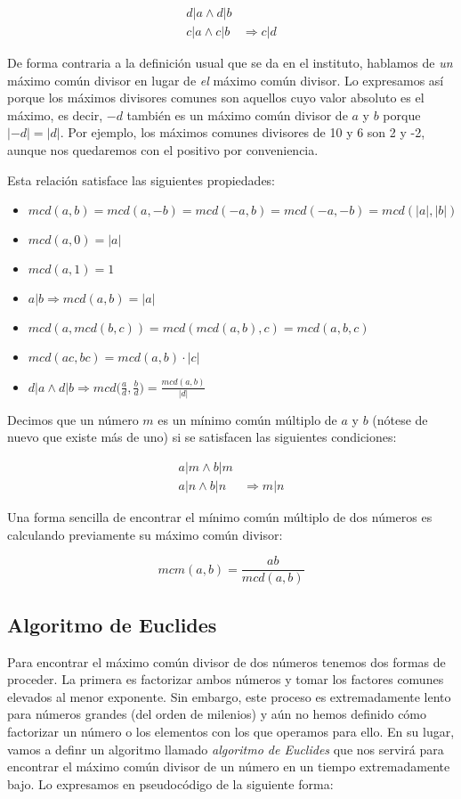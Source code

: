 \begin{align*}
	d|a \land d|b & \\
	c|a \land c|b & \Rightarrow c|d
\end{align*}

De forma contraria a la definición usual que se da en el instituto, hablamos de \textit{un} máximo común divisor en lugar de \textit{el} máximo común divisor.
Lo expresamos así porque los máximos divisores comunes son aquellos cuyo valor absoluto es el máximo, es decir, $-d$ también es un máximo común divisor de $a$ y $b$ porque $|-d| = |d|$.
Por ejemplo, los máximos comunes divisores de 10 y 6 son 2 y -2, aunque nos quedaremos con el positivo por conveniencia.

Esta relación satisface las siguientes propiedades:

\begin{itemize}
	\item $mcd(a,b) = mcd(a,-b) = mcd(-a,b) = mcd(-a,-b) = mcd(|a|,|b|)$
	\item $mcd(a,0) = |a|$
	\item $mcd(a,1) = 1$
	\item $a|b \Rightarrow mcd(a,b) = |a|$
	\item $mcd(a, mcd(b,c)) = mcd(mcd(a,b), c) = mcd(a,b,c)$
	\item $mcd(ac,bc) = mcd(a,b) \cdot |c|$
	\item $d|a \land d|b \Rightarrow mcd\big(\frac{a}{d},\frac{b}{d}\big) = \frac{mcd(a,b)}{|d|}$
\end{itemize}

Decimos que un número $m$ es un mínimo común múltiplo de $a$ y $b$ (nótese de nuevo que existe más de uno) si se satisfacen las siguientes condiciones:

\begin{align*}
	a|m \land b|m & \\
	a|n \land b|n & \Rightarrow m|n
\end{align*}

Una forma sencilla de encontrar el mínimo común múltiplo de dos números es calculando previamente su máximo común divisor:

\[mcm(a,b) = \frac{ab}{mcd(a,b)}\]

\subsection{Algoritmo de Euclides}

Para encontrar el máximo común divisor de dos números tenemos dos formas de proceder.
La primera es factorizar ambos números y tomar los factores comunes elevados al menor exponente.
Sin embargo, este proceso es extremadamente lento para números grandes (del orden de milenios) y aún no hemos definido cómo factorizar un número o los elementos con los que operamos para ello.
En su lugar, vamos a definr un algoritmo llamado \textit{algoritmo de Euclides} que nos servirá para encontrar el máximo común divisor de un número en un tiempo extremadamente bajo.
Lo expresamos en pseudocódigo de la siguiente forma:

